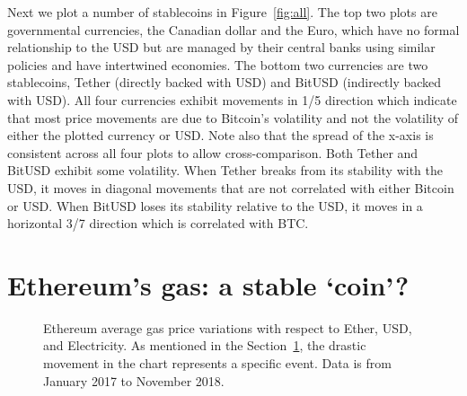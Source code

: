Next we plot a number of stablecoins in Figure~\ref{fig:all}. The top two plots are governmental currencies, the Canadian dollar and the Euro, which have no formal relationship to the USD but are managed by their central banks using similar policies and have intertwined economies. The bottom two currencies are two stablecoins, Tether (directly backed with USD) and BitUSD (indirectly backed with USD). All four currencies exhibit movements in 1/5 direction which indicate that most price movements are due to Bitcoin's volatility and not the volatility of either the plotted currency or USD. Note also that the spread of the x-axis is consistent across all four plots to allow cross-comparison. Both Tether and BitUSD exhibit some volatility. When Tether breaks from its stability with the USD, it moves in diagonal movements that are not correlated with either Bitcoin or USD. When BitUSD loses its stability relative to the USD, it moves in a horizontal 3/7 direction which is correlated with BTC.


\section {Ethereum's gas: a stable `coin'?}\label{sec:GasInvs}

\begin{figure}[t]
	\centering
	\hfill
	\caption {Ethereum average gas price variations with respect to Ether, USD, and Electricity. As mentioned in the Section~\ref{sec:GasInvs}, the drastic movement in the chart represents a specific event. Data is from January 2017 to November 2018.}
	\label{fig:gas}
\end{figure}

